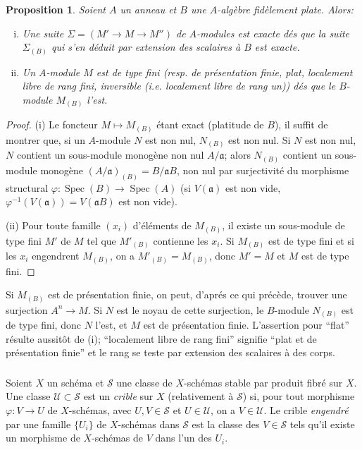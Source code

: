 \documentclass{book}
\DeclareMathOperator{\spec}{Spec}
\newcommand{\fa}{\mathfrak{a}}
\newcommand{\sS}{\mathscr{S}}
\newcommand{\sU}{\mathscr{U}}
\newtheorem{proposition}[subsubsection]{Proposition}
\begin{document}
\begin{proposition}\label{I:1-4-2}
Soient $A$ un anneau et $B$ une $A$-algèbre fidèlement plate. Alors:
\begin{enumerate}[(i)]
  \item Une suite $\Sigma=(M'\to M\to M'')$ de $A$-modules est exacte dés 
    que la suite $\Sigma_{(B)}$ qui s'en déduit par extension des scalaires 
    à $B$ est exacte.
  \item Un $A$-module $M$ est de type fini (resp. de présentation finie, 
    plat, localement libre de rang fini, inversible (i.e. localement libre 
    de rang un)) dés que le $B$-module $M_{(B)}$ l'est.
\end{enumerate}
\end{proposition}
\begin{proof}
(i) Le foncteur $M\mapsto M_{(B)}$ étant exact (platitude de $B$), il suffit 
de montrer que, si un $A$-module $N$ est non nul, $N_{(B)}$ est non nul. Si 
$N$ est non nul, $N$ contient un sous-module monogène non nul $A/\fa$; alors 
$N_{(B)}$ contient un sous-module monogène $(A/\fa)_{(B)} = B/\fa B$, non nul 
par surjectivité du morphisme structural $\varphi:\spec(B)\to\spec(A)$ (si 
$V(\fa)$ est non vide, $\varphi^{-1}(V(\fa))=V(\fa B)$ est non vide). 

(ii) Pour toute famille $(x_i)$ d'éléments de $M_{(B)}$, il existe un 
sous-module de type fini $M'$ de $M$ tel que $M'_{(B)}$ contienne les $x_i$. Si 
$M_{(B)}$ est de type fini et si les $x_i$ engendrent $M_{(B)}$, on a 
$M'_{(B)}=M_{(B)}$, donc $M'=M$ et $M$ est de type fini. 
\end{proof}

Si $M_{(B)}$ est de présentation finie, on peut, d'aprés ce qui précède, 
trouver une surjection $A^n\to M$. Si $N$ est le noyau de cette surjection, le 
$B$-module $N_{(B)}$ est de type fini, donc $N$ l'est, et $M$ est de 
présentation finie. L'assertion pour ``flat'' résulte aussitôt de (i); 
``localement libre de rang fini'' signifie ``plat et de présentation finie'' 
et le rang se teste par extension des scalaires à des corps.





\subsubsection{}\label{I:1-4-3}

Soient $X$ un schéma et $\sS$ une classe de $X$-schémas stable par produit 
fibré sur $X$. Une classe $\sU\subset \sS$ est un \emph{crible} sur $X$ 
(relativement à $\sS$) si, pour tout morphisme $\varphi:V\to U$ de 
$X$-schémas, avec $U,V\in \sS$ et $U\in\sU$, on a $V\in \sU$. Le crible 
\emph{engendré} par une famille $\{U_i\}$ de $X$-schémas dans $\sS$ est la 
classe des $V\in\sS$ tels qu'il existe un morphisme de $X$-schémas de $V$ dans 
l'un des $U_i$. 
\end{document}
